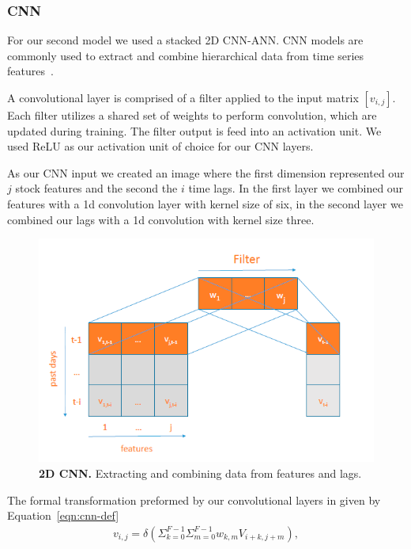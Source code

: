 \documentclass[12pt,journal,compsoc]{IEEEtran}
\begin{document}
\subsubsection{CNN}
\par For our second model we used a stacked 2D CNN-ANN. 
CNN models are commonly used to extract and combine hierarchical data from time series features~\cite{HOSEINZADE2019273}.
\par A convolutional layer is comprised of a filter applied to the input matrix $[v_{i,j}]$.
Each filter utilizes a shared set of weights to perform convolution, which are updated during training.
The filter output is feed into an activation unit. 
We used ReLU as our activation unit of choice for our CNN layers.
\par As our CNN input we created an image where the first dimension represented our $j$ stock features and the second the $i$ time lags.
In the first layer we combined our features with a 1d convolution layer with kernel size of six, in the second layer we combined our lags with a 1d convolution with kernel size three.
\begin{figure}[!ht]\centering
	\includegraphics[width=\linewidth]{images/CNNpred.png}
	\caption{\textbf{2D CNN.} Extracting and combining data from features and lags.}
	\label{fig:cnn-pred}
\end{figure}
\par The formal transformation preformed by our convolutional layers in given by Equation~\ref{eqn:cnn-def}
\begin{equation}
	\begin{aligned}
    v_{i,j} = \delta(\Sigma^{F-1}_{k=0} \Sigma^{F-1}_{m=0} w_{k,m} V_{i+k,j+m}),
    \end{aligned}
    \label{eqn:cnn-def}
\end{equation}
\end{document}
